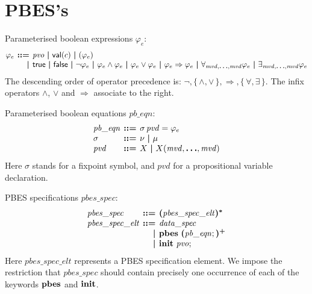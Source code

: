\documentclass[a4paper,fleqn,10pt]{article}
\makeatletter
\newcommand{\f}[1]{\ensuremath{\mathit{#1}}}
\newenvironment{tightarray}[1]
  {\setlength{\arraycolsep}{2pt}%
   \begin{array}{@{}#1@{}}%
  }
  {\end{array}%
  }
\newcommand{\set}[1]{\ensuremath{\{\,#1\,\}}}
\newcommand{\limp}{\ensuremath{\Rightarrow}}
\newcommand{\mb}[1]{\text{\boldmath$#1$}}
\newcommand{\kwinit}{{\bf init}}
\newcommand{\kwpbes}{{\bf pbes}}
\makeatother
\begin{document}
\section{PBES's}

Parameterised boolean expressions $\varphi_e$:
\[\begin{tightarray}{lrl}
\varphi_e & \mb{::=} & \f{pvo}\ \mb{|}\ 
                       \mathsf{val}(c)\ \mb{|}\ 
                       ( \varphi_e )\\ 
          & \mb{|}   & \mathsf{true}\ \mb{|}\ 
                       \mathsf{false}\ \mb{|}\ 
                       \neg \varphi_e\ \mb{|}\ 
                       \varphi_e \land \varphi_e\ \mb{|}\ 
                       \varphi_e \lor \varphi_e\ \mb{|}\ 
                       \varphi_e \limp \varphi_e\ \mb{|}\ 
                       \forall_{\f{mvd},\mb{\ldots},\f{mvd}} \varphi_e\ \mb{|}\ 
                       \exists_{\f{mvd},\mb{\ldots},\f{mvd}} \varphi_e\\ 
\end{tightarray}\]
The descending order of operator precedence is: $\neg, \set{\land, \lor}, \limp, \set{\forall, \exists}$.  
The infix operators $\land$, $\lor$ and $\limp$ associate to the right.

Parameterised boolean equations $\f{pb\_eqn}$:
\[\begin{tightarray}{lrl}
\f{pb\_eqn} & \mb{::=} & \sigma\,\f{pvd} = \varphi_e\\
\sigma      & \mb{::=} & \nu\ \mb{|}\ \mu\\
\f{pvd}     & \mb{::=} & X\ \mb{|}\ X(\f{mvd},\mb{\ldots},\f{mvd})\\
\end{tightarray}\]
Here $\sigma$ stands for a fixpoint symbol, and $\f{pvd}$ for a propositional variable declaration.

PBES specifications $\f{pbes\_spec}$:
\[\begin{tightarray}{lrl}
\f{pbes\_spec}      & \mb{::=} & \mb{(}\f{pbes\_spec\_elt}\mb{)^{*}}\\
\f{pbes\_spec\_elt} & \mb{::=} & \f{data\_spec}\\
                    & \mb{|} & \kwpbes\ \mb{(}\f{pb\_eqn};\mb{)^{+}}\\
                    & \mb{|} & \kwinit\ \f{pvo};
\end{tightarray}\]
Here $\f{pbes\_spec\_elt}$ represents a PBES specification element. We impose the restriction that $\f{pbes\_spec}$ should contain precisely one occurrence of each of the keywords $\kwpbes$ and $\kwinit$.
\end{document}

